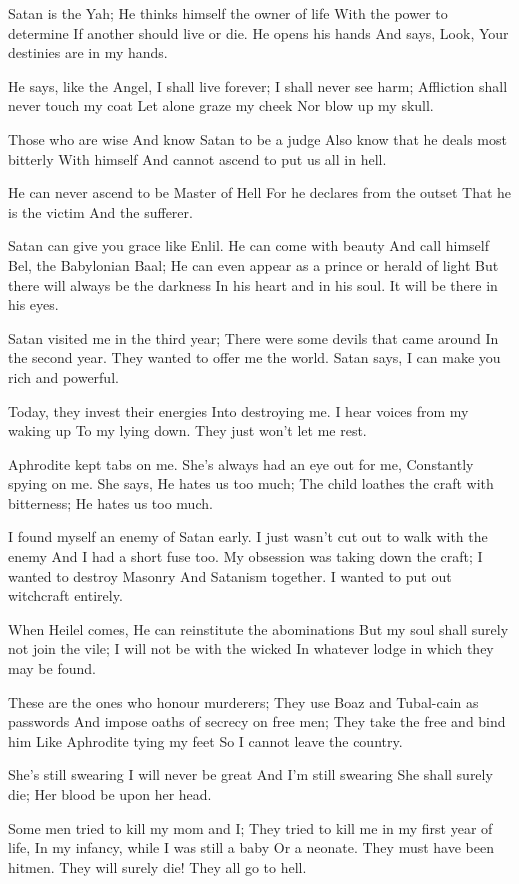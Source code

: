\documentclass[
]{book}
\begin{document}
Satan is the Yah;
He thinks himself the owner of life
With the power to determine
If another should live or die.
He opens his hands
And says, Look,
Your destinies are in my hands.

He says, like the Angel,
I shall live forever;
I shall never see harm;
Affliction shall never touch my coat
Let alone graze my cheek
Nor blow up my skull.

Those who are wise
And know Satan to be a judge
Also know that he deals most bitterly
With himself
And cannot ascend to put us all in hell.

He can never ascend to be Master of Hell
For he declares from the outset
That he is the victim
And the sufferer.

Satan can give you grace like Enlil.
He can come with beauty
And call himself Bel, the Babylonian Baal;
He can even appear as a prince or herald of light
But there will always be the darkness
In his heart and in his soul.
It will be there in his eyes.

Satan visited me in the third year;
There were some devils that came around
In the second year.
They wanted to offer me the world.
Satan says, I can make you rich and powerful.

Today, they invest their energies
Into destroying me.
I hear voices from my waking up
To my lying down.
They just won't let me rest.

Aphrodite kept tabs on me.
She's always had an eye out for me,
Constantly spying on me.
She says, He hates us too much;
The child loathes the craft with bitterness;
He hates us too much.

I found myself an enemy of Satan early.
I just wasn't cut out to walk with the enemy
And I had a short fuse too.
My obsession was taking down the craft;
I wanted to destroy Masonry
And Satanism together.
I wanted to put out witchcraft entirely.

When Heilel comes,
He can reinstitute the abominations
But my soul shall surely not join the vile;
I will not be with the wicked
In whatever lodge in which they may be found.

These are the ones who honour murderers;
They use Boaz and Tubal-cain as passwords
And impose oaths of secrecy on free men;
They take the free and bind him
Like Aphrodite tying my feet
So I cannot leave the country.

She's still swearing I will never be great
And I'm still swearing
She shall surely die;
Her blood be upon her head.

Some men tried to kill my mom and I;
They tried to kill me in my first year of life,
In my infancy, while I was still a baby
Or a neonate.
They must have been hitmen.
They will surely die!
They all go to hell.
\end{document}
